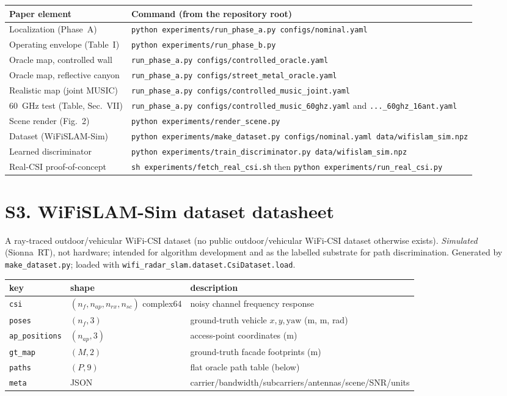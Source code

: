 \documentclass[10pt]{article}
\begin{document}
\begin{longtable}{@{}p{5.4cm}p{9.2cm}@{}}
\toprule
Paper element & Command (from the repository root) \\
\midrule
Localization (Phase~A) & \texttt{python experiments/run\_phase\_a.py configs/nominal.yaml} \\
Operating envelope (Table~I) & \texttt{python experiments/run\_phase\_b.py} \\
Oracle map, controlled wall & \texttt{run\_phase\_a.py configs/controlled\_oracle.yaml} \\
Oracle map, reflective canyon & \texttt{run\_phase\_a.py configs/street\_metal\_oracle.yaml} \\
Realistic map (joint MUSIC) & \texttt{run\_phase\_a.py configs/controlled\_music\_joint.yaml} \\
60~GHz test (Table, Sec.~VII) & \texttt{run\_phase\_a.py configs/controlled\_music\_60ghz.yaml} and \texttt{...\_60ghz\_16ant.yaml} \\
Scene render (Fig.~2) & \texttt{python experiments/render\_scene.py} \\
Dataset (WiFiSLAM-Sim) & \texttt{python experiments/make\_dataset.py configs/nominal.yaml data/wifislam\_sim.npz} \\
Learned discriminator & \texttt{python experiments/train\_discriminator.py data/wifislam\_sim.npz} \\
Real-CSI proof-of-concept & \texttt{sh experiments/fetch\_real\_csi.sh} then \texttt{python experiments/run\_real\_csi.py} \\
\bottomrule
\end{longtable}

\section*{S3. WiFiSLAM-Sim dataset datasheet}
A ray-traced outdoor/vehicular WiFi-CSI dataset (no public outdoor/vehicular
WiFi-CSI dataset otherwise exists). \emph{Simulated} (Sionna~RT), not hardware;
intended for algorithm development and as the labelled substrate for path
discrimination. Generated by \texttt{make\_dataset.py}; loaded with
\texttt{wifi\_radar\_slam.dataset.CsiDataset.load}.

\begin{tabular}{@{}lll@{}}
\toprule
key & shape & description \\
\midrule
\texttt{csi} & $(n_f, n_{ap}, n_{rx}, n_{sc})$ complex64 & noisy channel frequency response \\
\texttt{poses} & $(n_f, 3)$ & ground-truth vehicle $x,y,\text{yaw}$ (m, m, rad) \\
\texttt{ap\_positions} & $(n_{ap}, 3)$ & access-point coordinates (m) \\
\texttt{gt\_map} & $(M, 2)$ & ground-truth facade footprints (m) \\
\texttt{paths} & $(P, 9)$ & flat oracle path table (below) \\
\texttt{meta} & JSON & carrier/bandwidth/subcarriers/antennas/scene/SNR/units \\
\bottomrule
\end{tabular}
\end{document}
